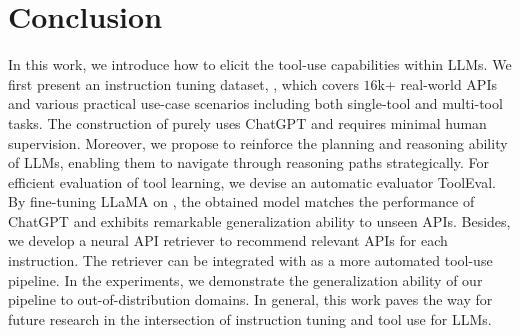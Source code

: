 \section{Conclusion}
In this work, we introduce how to elicit the tool-use capabilities within LLMs. We first present an instruction tuning dataset, \ourdata, which covers $16$k+ real-world APIs and various practical use-case scenarios including both single-tool and multi-tool tasks. 
The construction of \ourdata purely uses ChatGPT and requires minimal human supervision.
Moreover, we propose \dfs to reinforce the planning and reasoning ability of LLMs, enabling them to navigate through reasoning paths strategically. 
For efficient evaluation of tool learning, we devise an automatic evaluator ToolEval.
By fine-tuning LLaMA on \ourdata, the obtained model \ourmodel matches the performance of ChatGPT and exhibits remarkable generalization ability to unseen APIs.
Besides, we develop a neural API retriever to recommend relevant APIs for each instruction. The retriever can be integrated with \ourmodel as a more automated tool-use pipeline.
In the experiments, we demonstrate the generalization ability of our pipeline to out-of-distribution domains.
In general, this work paves the way for future research in the intersection of instruction tuning and tool use for LLMs.



